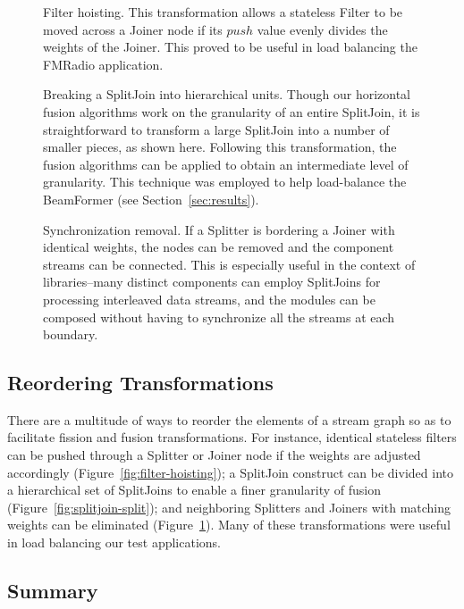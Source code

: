 \begin{figure}
\centering
{}
\caption{\protect\small Filter hoisting.  This transformation allows a
stateless Filter to be moved across a Joiner node if its $push$ value
evenly divides the weights of the Joiner.  This proved to be useful in
load balancing the FMRadio application.
\protect\label{fig:filter-hoisting}}
\vspace{12pt}
\caption{\protect\small Breaking a SplitJoin into hierarchical units.
Though our horizontal fusion algorithms work on the granularity of an
entire SplitJoin, it is straightforward to transform a large SplitJoin
into a number of smaller pieces, as shown here.  Following this
transformation, the fusion algorithms can be applied to obtain an
intermediate level of granularity.  This technique was employed to
help load-balance the BeamFormer (see Section~\ref{sec:results}).
\protect\label{fig:splitjoin-split}}
\vspace{12pt}
\caption{\protect\small Synchronization removal.  If a Splitter is
bordering a Joiner with identical weights, the nodes can be removed
and the component streams can be connected.  This is especially useful
in the context of libraries--many distinct components can employ
SplitJoins for processing interleaved data streams, and the modules
can be composed without having to synchronize all the streams at each
boundary.  \protect\label{fig:sync-removal}}
\vspace{-6pt}
\end{figure}

\subsection{Reordering Transformations}
There are a multitude of ways to reorder the elements of a stream
graph so as to facilitate fission and fusion transformations.  For
instance, identical stateless filters can be pushed through a Splitter
or Joiner node if the weights are adjusted accordingly
(Figure~\ref{fig:filter-hoisting}); a SplitJoin construct can be
divided into a hierarchical set of SplitJoins to enable a finer
granularity of fusion (Figure~\ref{fig:splitjoin-split}); and
neighboring Splitters and Joiners with matching weights can be
eliminated (Figure~\ref{fig:sync-removal}).  Many of these
transformations were useful in load balancing our test applications.

\subsection{Summary}

